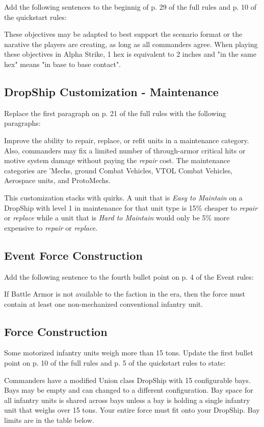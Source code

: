 Add the following sentences to the beginnig of p. 29 of the full rules and p. 10 of the quickstart rules:

These objectives may be adapted to best support the scenario format or the narative the players are creating, as long as all commanders agree.
When playing these objectives in Alpha Strike, 1 hex is equivalent to 2 inches and "in the same hex" means "in base to base contact".

\subsection{DropShip Customization - Maintenance}

Replace the first paragraph on p. 21 of the full rules with the following paragraphs:

Improve the ability to repair, replace, or refit units in a maintenance category.
Also, commanders may fix a limited number of through-armor critical hits or motive system damage without paying the \emph{repair} cost.
The maintenance categories are 'Mechs, ground Combat Vehicles, VTOL Combat Vehicles, Aerospace units, and ProtoMechs.

This customization stacks with quirks.
A unit that is \emph{Easy to Maintain} on a DropShip with level 1 in maintenance for that unit type is 15\% cheaper to \emph{repair} or \emph{replace} while a unit that is \emph{Hard to Maintain} would only be 5\% more expensive to \emph{repair} or \emph{replace}.

\subsection{Event Force Construction}

Add the following sentence to the fourth bullet point on p. 4 of the Event rules:

If Battle Armor is not available to the faction in the era, then the force must contain at least one non-mechanized conventional infantry unit.

\subsection{Force Construction}

Some motorized infantry units weigh more than 15 tons.
Update the first bullet point on p. 10 of the full rules and p. 5 of the quickstart rules to state:

Commanders have a modified Union class DropShip with 15 configurable bays.
Bays may be empty and can changed to a different configuration.
Bay space for all infantry units is shared across bays unless a bay is holding a single infantry unit that weighs over 15 tons.
Your entire force must fit onto your DropShip.
Bay limits are in the table below.

